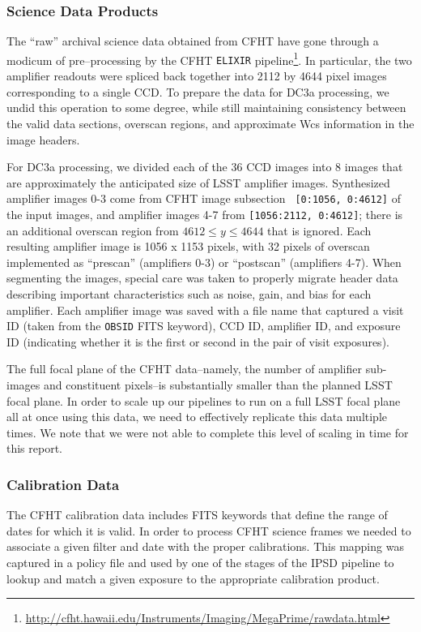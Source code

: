 \subsubsection{Science Data Products}

The ``raw'' archival science data obtained from CFHT have gone through
a modicum of pre--processing by the CFHT {\tt ELIXIR}
pipeline\footnote{\url{http://cfht.hawaii.edu/Instruments/Imaging/MegaPrime/rawdata.html}}.
In particular, the two amplifier readouts were spliced back together
into 2112 by 4644 pixel images corresponding to a single CCD.  To
prepare the data for DC3a processing, we undid this operation to some
degree, while still maintaining consistency between the valid data
sections, overscan regions, and approximate Wcs information in the
image headers. 

For DC3a processing, we divided each of the 36 CCD images into 8 images
that are approximately the anticipated size of LSST amplifier images.
Synthesized amplifier images 0-3 come from CFHT image subsection {\tt
[0:1056, 0:4612]} of the input images, and amplifier images 4-7 from
{\tt [1056:2112, 0:4612]}; there is an additional overscan region from
$4612 \leq y \leq 4644$ that is ignored.  Each resulting amplifier
image is 1056 x 1153 pixels, with 32 pixels of overscan implemented as
``prescan'' (amplifiers 0-3) or ``postscan'' (amplifiers 4-7).  
When segmenting the images, special care was taken to properly migrate
header data describing important characteristics such as noise, gain,
and bias for each amplifier.  Each amplifier image was saved with a
file name that captured a visit ID (taken from the \texttt{OBSID} FITS
keyword), CCD ID, amplifier ID, and exposure ID (indicating whether it
is the first or second in the pair of visit exposures).  

The full focal plane of the CFHT data--namely, the number of amplifier
sub-images and constituent pixels--is substantially smaller than
the planned LSST focal plane.  In order to scale up our pipelines to
run on a full LSST focal plane all at once using this data, we need to
effectively replicate this data multiple times.  We note that we were
not able to complete this level of scaling in time for this report.  

\subsubsection{Calibration Data}

The CFHT calibration data includes FITS keywords that define the range
of dates for which it is valid.  In order to process CFHT science frames
we needed to associate a given filter and date with the proper
calibrations.  This mapping was captured in a policy file and used by
one of the stages of the IPSD pipeline to lookup and match a given
exposure to the appropriate calibration product.  

